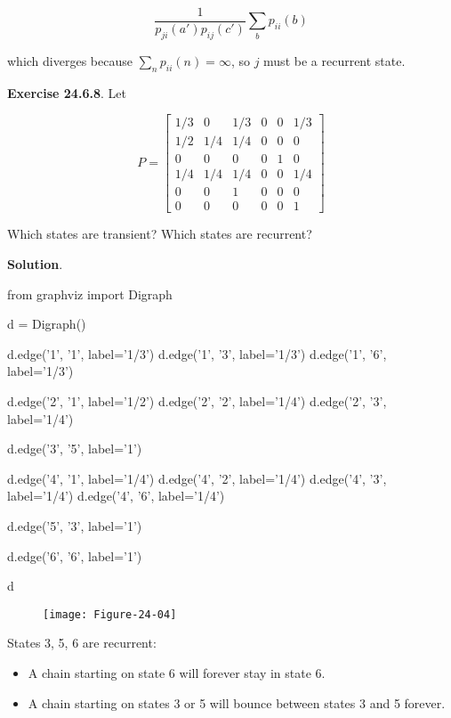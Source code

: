 \[\frac{1}{p_{ji}(a') p_{ij}(c')} \sum_b p_{ii}(b)\]

which diverges because \(\sum_n p_{ii}(n) = \infty\), so \(j\) must be a
recurrent state.

\textbf{Exercise 24.6.8}. Let

\[ P = \begin{bmatrix}
1/3 & 0   & 1/3 & 0 & 0 & 1/3 \\
1/2 & 1/4 & 1/4 & 0 & 0 & 0   \\
0   & 0   & 0   & 0 & 1 & 0   \\
1/4 & 1/4 & 1/4 & 0 & 0 & 1/4 \\
0   & 0   & 1   & 0 & 0 & 0   \\
0   & 0   & 0   & 0 & 0 & 1
\end{bmatrix}\]

Which states are transient? Which states are recurrent?

\textbf{Solution}.

\begin{python}
from graphviz import Digraph

d = Digraph()

d.edge('1', '1', label='1/3')
d.edge('1', '3', label='1/3')
d.edge('1', '6', label='1/3')

d.edge('2', '1', label='1/2')
d.edge('2', '2', label='1/4')
d.edge('2', '3', label='1/4')

d.edge('3', '5', label='1')

d.edge('4', '1', label='1/4')
d.edge('4', '2', label='1/4')
d.edge('4', '3', label='1/4')
d.edge('4', '6', label='1/4')

d.edge('5', '3', label='1')

d.edge('6', '6', label='1')

d
\end{python}
 
\begin{figure}[H]
\texttt{[image: Figure-24-04]}
\end{figure}

States 3, 5, 6 are recurrent:

\begin{itemize}[tightlist]
\item
  A chain starting on state 6 will forever stay in state 6.
\item
  A chain starting on states 3 or 5 will bounce between states 3 and 5
  forever.
\end{itemize}

